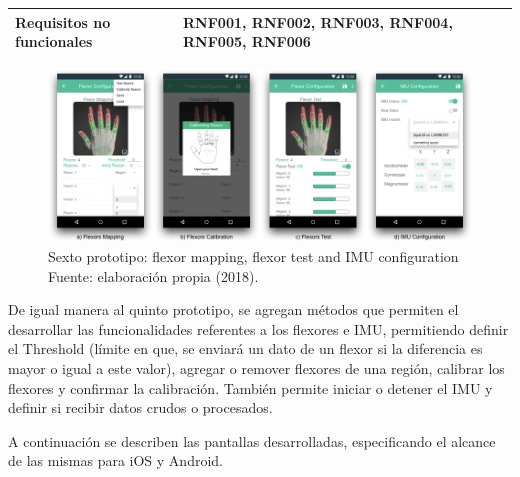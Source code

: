 \begin{table}[H]
\begin{tabular}{|l|l|}
Requisitos no funcionales & RNF001, RNF002, RNF003, RNF004, RNF005, RNF006                                                                                                                                                                                                                                                                            \\ \hline
\end{tabular}
\end{table}


\begin{figure}[H]
	\centering
	\captionsetup{justification=centering}
   	\includegraphics[width=1.0\textwidth]{images/chapter03/06-prototype/06-prototype.png} 
            \caption[Sexto prototipo: flexor mapping, flexor test and IMU configuration]{Sexto prototipo: flexor mapping, flexor test and IMU configuration\\ Fuente: elaboración propia (2018).}
    \label{fig:prototype-06}
\end{figure}

De igual manera al quinto prototipo, se agregan métodos que permiten el desarrollar las funcionalidades referentes a los flexores e IMU, permitiendo definir el Threshold (límite en que, se enviará un dato de un flexor si la diferencia es mayor o igual a este valor), agregar o remover flexores de una región, calibrar los flexores y confirmar la calibración. También permite iniciar o detener el IMU y definir si recibir datos crudos o procesados.

A continuación se describen las pantallas desarrolladas, especificando el alcance de las mismas para iOS y Android.

